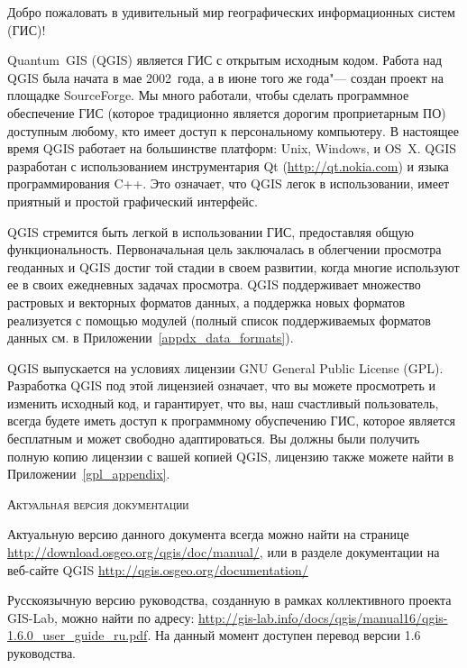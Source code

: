 \mainmatter
\pagestyle{scrheadings}
\label{label_forward}
\setcounter{page}{1}



Добро пожаловать в удивительный мир географических информационных систем
(ГИС)!

Quantum~GIS (QGIS) является ГИС с открытым исходным кодом. Работа
над QGIS была начата в мае 2002~года, а в июне того же года"--- создан
проект на площадке SourceForge. Мы много работали, чтобы сделать
программное обеспечение ГИС (которое традиционно является дорогим
проприетарным ПО) доступным любому, кто имеет
доступ к персональному компьютеру. В настоящее время QGIS работает на
большинстве платформ: Unix, Windows, и OS~X. QGIS разработан с
использованием инструментария Qt (\url{http://qt.nokia.com}) и языка
программирования C++.
Это означает, что QGIS легок в использовании, имеет приятный и простой
графический интерфейс.

QGIS стремится быть легкой в использовании ГИС, предоставляя общую
функциональность. Первоначальная цель заключалась в облегчении
просмотра геоданных и QGIS достиг той стадии в своем развитии, когда
многие используют ее в своих ежедневных задачах просмотра.
QGIS поддерживает множество растровых и векторных форматов данных, а
поддержка новых форматов реализуется с помощью модулей (полный список
поддерживаемых форматов данных см. в Приложении~\ref{appdx_data_formats}).

QGIS выпускается на условиях лицензии GNU General Public License (GPL).
Разработка QGIS под этой лицензией означает, что вы можете просмотреть и
изменить исходный код, и гарантирует, что вы, наш счастливый
пользователь, всегда будете иметь доступ к программному обуспечению ГИС,
которое является бесплатным и может свободно адаптироваться. Вы должны
были получить полную копию лицензии с вашей копией QGIS, лицензию также
можете найти в Приложении~\ref{gpl_appendix}.

\begin{Tip}\caption{\textsc{Актуальная версия документации}}
Актуальную версию данного документа всегда можно найти на странице
\url{http://download.osgeo.org/qgis/doc/manual/}, или в разделе
документации на веб-сайте QGIS \url{http://qgis.osgeo.org/documentation/}
\end{Tip}

Русскоязычную версию руководства, созданную в рамках коллективного
проекта GIS-Lab, можно найти по адресу:
\url{http://gis-lab.info/docs/qgis/manual16/qgis-1.6.0_user_guide_ru.pdf}.
На данный момент доступен перевод версии 1.6 руководства.

